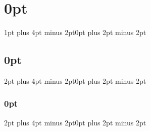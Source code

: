 











\titlespacing\section{0pt}{1pt plus 4pt minus 2pt}{0pt plus 2pt minus 2pt}
\titlespacing\subsection{0pt}{2pt plus 4pt minus 2pt}{0pt plus 2pt minus 2pt}
\titlespacing\subsubsection{0pt}{2pt plus 4pt minus 2pt}{0pt plus 2pt minus 2pt}
